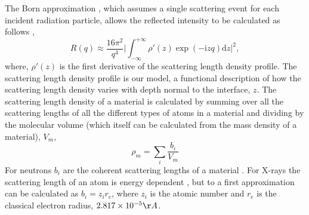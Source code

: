 \documentclass[
 reprint,
 superscriptaddress,
 amsmath,amssymb,
 aps,
]{revtex4-1}
\begin{document}
The Born approximation \cite{born_quantenmechanik_1926}, which assumes a single scattering event for each incident radiation particle, allows the reflected intensity to be calculated as follows \cite{sivia_elementary_2011},
%
\begin{equation}
    R(q) \approx \frac{16\pi^2}{q^4} \bigg| \int^{+\infty}_{-\infty}{\rho'(z)\exp{(-\mathrm{i} zq) \text{d}z} \bigg|^2},
    \label{equ:kine}
\end{equation}
%
where, $\rho'(z)$ is the first derivative of the scattering length density profile.
The scattering length density profile is our model, a functional description of how the scattering length density varies with depth normal to the interface, $z$.
 The scattering length density of a material is calculated by summing over all the scattering lengths of all the different types of atoms in a material and dividing by the molecular volume (which itself can be calculated from the mass density of a material), $V_m$,
\begin{equation}
    \rho_m = \sum_{i} \frac{b_i}{V_m}
    \label{equ:sld}
\end{equation}
 For neutrons $b_i$ are the coherent scattering lengths of a material \cite{sears1992, dianoux2003neutron}. For X-rays the scattering length of an atom is energy dependent \cite{xray_form_factor}, but to a first approximation can be calculated as $b_i = z_i  r_e$, where $z_i$ is the atomic number and $r_e$ is the classical electron radius, $2.817 \times 10^{-5} \AA$.
 
\end{document}
